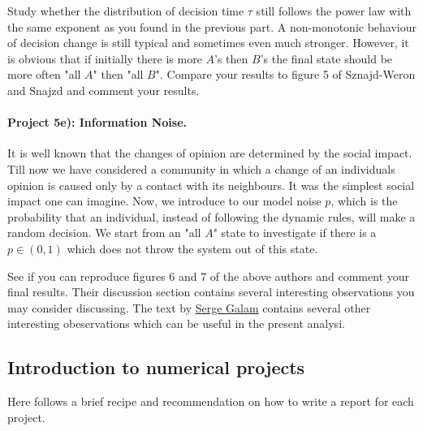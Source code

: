 \documentclass[%
oneside,                 %
final,                   %
10pt]{article}
\begin{document}
Study whether the distribution of decision time $\tau$ still follows
the power law with the same exponent as you found in the previous
part.  A non-monotonic behaviour of decision change is still typical
and sometimes even much stronger.  However, it is obvious that if
initially there is more $A$'s then $B$'s the final state should be
more often "all $A$" then "all $B$".  Compare your results to figure 5
of Sznajd-Weron and Snajzd and comment your results.

\paragraph{Project 5e): Information Noise.}
It is well known that the changes of opinion are determined by the
social impact. Till now we have considered a community in which a
change of an individuals opinion is caused only by a contact with its
neighbours. It was the simplest social impact one can imagine.  Now,
we introduce to our model noise $p$, which is the probability that an
individual, instead of following the dynamic rules, will make a random
decision. We start from an "all $A$" state to investigate if there is
a $p \in (0,1)$ which does not throw the system out of this state.

See if you can reproduce figures 6 and 7 of the above authors and
comment your final results. Their discussion section contains several interesting observations you may consider discussing. The text by \href{{https://www.springer.com/gp/book/9781461420316}}{Serge Galam} contains several other interesting obeservations which can be useful in the present analysi.

\subsection{Introduction to numerical projects}

Here follows a brief recipe and recommendation on how to write a report for each
project.
\end{document}
